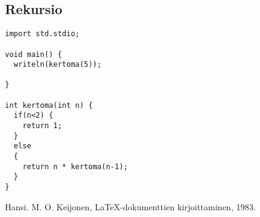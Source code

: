 \documentclass[11pt,oneside,a4paper]{article}
\begin{document}
\subsection{Rekursio}

\begin{verbatim}
import std.stdio;

void main() {
  writeln(kertoma(5));

}

int kertoma(int n) {
  if(n<2) {
    return 1;
  }
  else
  {
    return n * kertoma(n-1);
  }
}
\end{verbatim}




\begin{thebibliography}{99}

 Hansi. M. O. Keijonen, LaTeX-dokumenttien kirjoittaminen, 1983.
\end{thebibliography}
\end{document}
